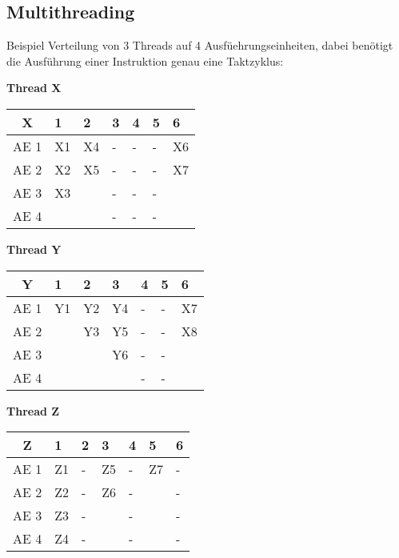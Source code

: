 \documentclass
[
	8pt,		%
	ngerman,	%
	a4paper,	%
	landscape,	%
	final		%
]{extarticle}
\begin{document}
\begin{multicols*}{4}
\section{Multithreading}
Beispiel Verteilung von 3 Threads auf 4 Ausfüehrungseinheiten, dabei
benötigt die Ausführung einer Instruktion genau eine Taktzyklus:
\par\vspace{\abovedisplayskip}

\textbf{Thread X}\par\vspace{\abovedisplayskip}
\begin{tabularx}{\linewidth}{|c|XXXXXX|}\hline
	X    & 1  & 2  & 3 & 4 & 5 & 6  \\\hline
	AE 1 & X1 & X4 & - & - & - & X6 \\
	AE 2 & X2 & X5 & - & - & - & X7 \\
	AE 3 & X3 &    & - & - & - &    \\
	AE 4 &    &    & - & - & - &    \\\hline
\end{tabularx}\par\vspace{\belowdisplayskip}

\textbf{Thread Y}\par\vspace{\abovedisplayskip}
\begin{tabularx}{\linewidth}{|c|XXXXXX|}\hline
	Y    & 1  & 2  & 3  & 4 & 5 & 6  \\\hline
	AE 1 & Y1 & Y2 & Y4 & - & - & X7 \\
	AE 2 &    & Y3 & Y5 & - & - & X8 \\
	AE 3 &    &    & Y6 & - & - &    \\
	AE 4 &    &    &    & - & - &    \\\hline
\end{tabularx}\par\vspace{\belowdisplayskip}

\textbf{Thread Z}\par\vspace{\abovedisplayskip}
\begin{tabularx}{\linewidth}{|c|XXXXXX|}\hline
	Z    & 1  & 2 & 3  & 4 & 5  & 6 \\\hline
	AE 1 & Z1 & - & Z5 & - & Z7 & - \\
	AE 2 & Z2 & - & Z6 & - &    & - \\
	AE 3 & Z3 & - &    & - &    & - \\
	AE 4 & Z4 & - &    & - &    & - \\\hline
\end{tabularx}\par\vspace{\belowdisplayskip}

\end{multicols*}
\end{document}

